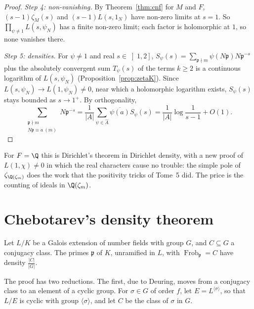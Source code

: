 \begin{proof}
\emph{Step 4: non-vanishing.} By Theorem~\ref{thm:cnf} for $M$ and $F$, $(s-1)\zeta_M(s)$ and $(s-1)L(s,1_N)$ have non-zero limits at $s=1$. So
$\prod_{\psi\ne1}L(s,\psi_N)$ has a finite non-zero limit; each factor is holomorphic at $1$, so none vanishes there.

\emph{Step 5: densities.} For $\psi\ne1$ and real $s\in\left]1,2\right]$, $S_\psi(s)=\sum_{\mathfrak p\nmid m}\psi(N\mathfrak p)N\mathfrak p^{-s}$ plus the
absolutely convergent sum $T_\psi(s)$ of the terms $k\ge2$ is a continuous logarithm of $L(s,\psi_N)$ (Proposition~\ref{prop:zetaK}). Since
$L(s,\psi_N)\to L(1,\psi_N)\ne0$, near which a holomorphic logarithm exists, $S_\psi(s)$ stays bounded as $s\to1^+$. By orthogonality,
\[
\sum_{\substack{\mathfrak p\nmid m\\ N\mathfrak p\equiv a\ (m)}}N\mathfrak p^{-s}=\frac1{|A|}\sum_{\psi\in\widehat A}\overline{\psi(a)}S_\psi(s)
=\frac1{|A|}\log\frac1{s-1}+O(1).
\]
\end{proof}

For $F=\Q$ this is Dirichlet's theorem in Dirichlet density, with a new proof of $L(1,\chi)\ne0$ in which the real characters cause no trouble: the
simple pole of $\zeta_{\Q(\zeta_m)}$ does the work that the positivity tricks of Tome~5 did. The price is the counting of ideals in
$\Q(\zeta_m)$.

\section{Chebotarev's density theorem}

\begin{theorem}[Chebotarev, 1922]\label{thm:chebotarev}
Let $L/K$ be a Galois extension of number fields with group $G$, and $C\subseteq G$ a conjugacy class. The primes $\mathfrak p$ of $K$, unramified in
$L$, with $\operatorname{Frob}_{\mathfrak p}=C$ have density $\frac{|C|}{|G|}$.
\end{theorem}

The proof has two reductions. The first, due to Deuring, moves from a conjugacy class to an element of a cyclic group. For $\sigma\in G$ of
order $f$, let $E=L^{\langle\sigma\rangle}$, so that $L/E$ is cyclic with group $\langle\sigma\rangle$, and let $C$ be the class of $\sigma$ in
$G$.

